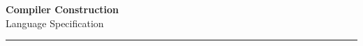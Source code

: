 \documentclass[10pt,a4paper]{exam} %
\begin{document}
\newcommand{\course}{Compiler Construction}
\newcommand{\week}{I}

\everymath{\color{campurpledark}}
\everydisplay{\color{campurpledark}}




\marksnotpoints
\pointsdroppedatright
\marksnotpoints
\marginpointname{ \points}

\begin{center}
\LARGE {\textbf{\color{campurpledark} \course} }\\[-0.2cm]
\Large \color{campurpledark} Language Specification\\
\end{center}

{\color{campurple}\hrule}

\newcommand{\metavar}[1]{{\color{campurple}#1}}

\vspace{0.5cm}

\newcommand{\terminal}[1]{\texttt{\color{campurple}#1}}
\newcommand{\bl}[1]{{\color{black}#1}}
\end{document}
